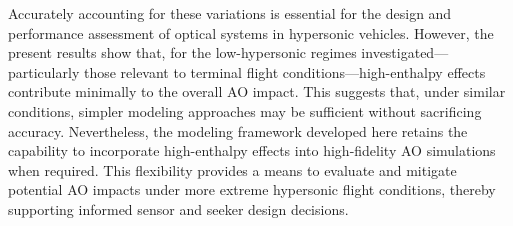 Accurately accounting for these variations is essential for the design and
performance assessment of optical systems in hypersonic vehicles. However, the
present results show that, for the low-hypersonic regimes
investigated—particularly those relevant to terminal flight
conditions—high-enthalpy effects contribute minimally to the overall \gls{AO}
impact. This suggests that, under similar conditions, simpler modeling
approaches may be sufficient without sacrificing accuracy. Nevertheless, the
modeling framework developed here retains the capability to incorporate
high-enthalpy effects into high-fidelity \gls{AO} simulations when required.
This flexibility provides a means to evaluate and mitigate potential \gls{AO}
impacts under more extreme hypersonic flight conditions, thereby supporting
informed sensor and seeker design decisions.



